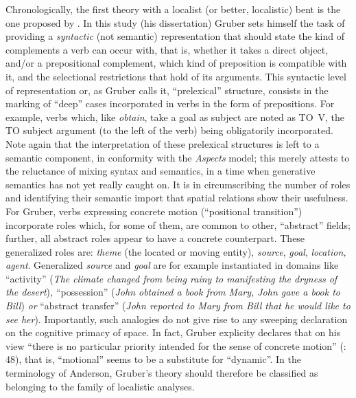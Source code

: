\documentclass[output=paper]{langscibook}
\begin{document}
Chronologically, the first theory with a localist (or better, localistic) bent is the one proposed by \citet{gruber_studies_1965}. In this study (his dissertation) Gruber sets himself the task of providing a \textit{syntactic} (not semantic) representation that should state the kind of complements a verb can occur with, that is, whether it takes a direct object, and/or a prepositional complement, which kind of preposition is compatible with it, and the selectional restrictions that hold of its arguments. This syntactic level of representation or, as Gruber calls it, “prelexical” structure, consists in the marking of “deep” cases incorporated in verbs in the form of prepositions. For example, verbs which, like \textit{obtain}, take a goal as subject are noted as TO~V, the TO subject argument (to the left of the verb) being obligatorily incorporated. Note again that the interpretation of these prelexical structures is left to a semantic component, in conformity with the \textit{Aspects} model; this merely attests to the reluctance of mixing syntax and semantics, in a time when generative semantics has not yet really caught on. It is in circumscribing the number of roles and identifying their semantic import that spatial relations show their usefulness. For Gruber, verbs expressing concrete motion (“positional transition”) incorporate roles which, for some of them, are common to other, “abstract” fields; further, all abstract roles appear to have a concrete counterpart. These generalized roles are: \textit{theme} (the located or moving entity), \textit{source}, \textit{goal}, \textit{location, agent}. Generalized \textit{source} and \textit{goal} are for example instantiated in domains like “activity” (\textit{The climate changed from being rainy to manifesting the dryness of the desert})\textit{, }“possession” (\textit{John obtained a book from Mary, John gave a book to Bill})\textit{ or }“abstract transfer” (\textit{John reported to Mary from Bill that he would like to see her}). Importantly, such analogies do not give rise to any sweeping declaration on the cognitive primacy of space. In fact, Gruber explicity declares that on his view “there is no particular priority intended for the sense of concrete motion” (\citealt{gruber_studies_1965}: 48), that is, “motional” seems to be a substitute for “dynamic”. In the terminology of Anderson, Gruber’s theory should therefore be classified as belonging to the family of localistic analyses.
\end{document}
